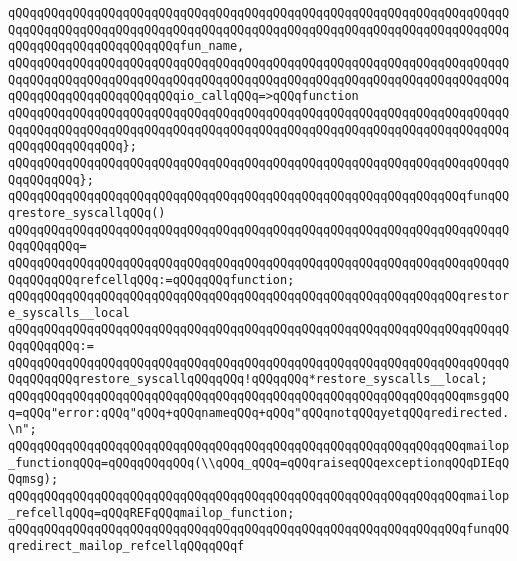 \verb|qQQqqQQqqQQqqQQqqQQqqQQqqQQqqQQqqQQqqQQqqQQqqQQqqQQqqQQqqQQqqQQqqQQqqQQqqQQqqQQqqQQqqQQqqQQqqQQqqQQqqQQqqQQqqQQqqQQqqQQqqQQqqQQqqQQqqQQqqQQqqQQqqQQqqQQqqQQqqQQqqQQqfun_name,|\newline
\verb|qQQqqQQqqQQqqQQqqQQqqQQqqQQqqQQqqQQqqQQqqQQqqQQqqQQqqQQqqQQqqQQqqQQqqQQqqQQqqQQqqQQqqQQqqQQqqQQqqQQqqQQqqQQqqQQqqQQqqQQqqQQqqQQqqQQqqQQqqQQqqQQqqQQqqQQqqQQqqQQqqQQqio_callqQQq=>qQQqfunction|\newline
\verb|qQQqqQQqqQQqqQQqqQQqqQQqqQQqqQQqqQQqqQQqqQQqqQQqqQQqqQQqqQQqqQQqqQQqqQQqqQQqqQQqqQQqqQQqqQQqqQQqqQQqqQQqqQQqqQQqqQQqqQQqqQQqqQQqqQQqqQQqqQQqqQQqqQQqqQQqqQQq};|\newline
\verb|qQQqqQQqqQQqqQQqqQQqqQQqqQQqqQQqqQQqqQQqqQQqqQQqqQQqqQQqqQQqqQQqqQQqqQQqqQQqqQQq};|\newline
\newline
\verb|qQQqqQQqqQQqqQQqqQQqqQQqqQQqqQQqqQQqqQQqqQQqqQQqqQQqqQQqqQQqqQQqfunqQQqrestore_syscallqQQq()|\newline
\verb|qQQqqQQqqQQqqQQqqQQqqQQqqQQqqQQqqQQqqQQqqQQqqQQqqQQqqQQqqQQqqQQqqQQqqQQqqQQqqQQq=|\newline
\verb|qQQqqQQqqQQqqQQqqQQqqQQqqQQqqQQqqQQqqQQqqQQqqQQqqQQqqQQqqQQqqQQqqQQqqQQqqQQqqQQqrefcellqQQq:=qQQqqQQqfunction;|\newline
\newline
\verb|qQQqqQQqqQQqqQQqqQQqqQQqqQQqqQQqqQQqqQQqqQQqqQQqqQQqqQQqqQQqqQQqrestore_syscalls__local|\newline
\verb|qQQqqQQqqQQqqQQqqQQqqQQqqQQqqQQqqQQqqQQqqQQqqQQqqQQqqQQqqQQqqQQqqQQqqQQqqQQqqQQq:=|\newline
\verb|qQQqqQQqqQQqqQQqqQQqqQQqqQQqqQQqqQQqqQQqqQQqqQQqqQQqqQQqqQQqqQQqqQQqqQQqqQQqqQQqrestore_syscallqQQqqQQq!qQQqqQQq*restore_syscalls__local;|\newline
\newline
\verb|qQQqqQQqqQQqqQQqqQQqqQQqqQQqqQQqqQQqqQQqqQQqqQQqqQQqqQQqqQQqqQQqmsgqQQq=qQQq"error:qQQq"qQQq+qQQqnameqQQq+qQQq"qQQqnotqQQqyetqQQqredirected.\n";|\newline
\verb|qQQqqQQqqQQqqQQqqQQqqQQqqQQqqQQqqQQqqQQqqQQqqQQqqQQqqQQqqQQqqQQqmailop_functionqQQq=qQQqqQQqqQQq(\\qQQq_qQQq=qQQqraiseqQQqexceptionqQQqDIEqQQqmsg);|\newline
\verb|qQQqqQQqqQQqqQQqqQQqqQQqqQQqqQQqqQQqqQQqqQQqqQQqqQQqqQQqqQQqqQQqmailop_refcellqQQq=qQQqREFqQQqmailop_function;|\newline
\verb|qQQqqQQqqQQqqQQqqQQqqQQqqQQqqQQqqQQqqQQqqQQqqQQqqQQqqQQqqQQqqQQqfunqQQqredirect_mailop_refcellqQQqqQQqf|\newline

